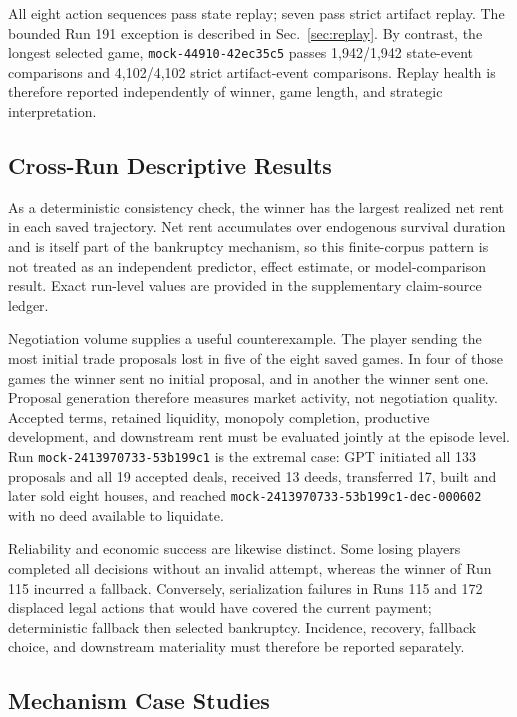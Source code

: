 \documentclass[conference]{IEEEtran}
\newcommand{\runid}[1]{\nolinkurl{#1}}
\begin{document}
All eight action sequences pass state replay; seven pass strict artifact
replay. The bounded Run 191 exception is described in
Sec.~\ref{sec:replay}. By contrast, the longest selected game,
\runid{mock-44910-42ec35c5} passes 1,942/1,942 state-event comparisons and
4,102/4,102 strict artifact-event comparisons. Replay health is therefore
reported independently of winner, game length, and strategic interpretation.

\subsection{Cross-Run Descriptive Results}

As a deterministic consistency check, the winner has the largest realized net
rent in each saved trajectory. Net rent accumulates over endogenous survival
duration and is itself part of the bankruptcy mechanism, so this finite-corpus
pattern is not treated as an independent predictor, effect estimate, or
model-comparison result. Exact run-level values are provided in the
supplementary claim-source ledger.

Negotiation volume supplies a useful counterexample. The player sending the
most initial trade proposals lost in five of the eight saved games. In four of
those games the winner sent no initial proposal, and in another the winner sent
one.
Proposal generation therefore measures market activity, not negotiation
quality. Accepted terms, retained liquidity, monopoly completion, productive
development, and downstream rent must be evaluated jointly at the episode
level. Run \runid{mock-2413970733-53b199c1} is the extremal case: GPT initiated
all 133 proposals and all 19 accepted deals, received 13 deeds, transferred 17,
built and later sold eight houses, and reached
\runid{mock-2413970733-53b199c1-dec-000602} with no deed available to
liquidate.

Reliability and economic success are likewise distinct. Some losing players
completed all decisions without an invalid attempt, whereas the winner of Run
115 incurred a fallback. Conversely, serialization failures in Runs 115 and
172 displaced legal actions that would have covered the current payment;
deterministic fallback then selected bankruptcy. Incidence, recovery, fallback
choice, and downstream materiality must therefore be reported separately.

\subsection{Mechanism Case Studies}
\end{document}
